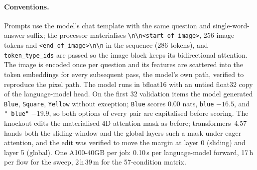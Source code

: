 \documentclass[11pt,a4paper]{article}
\begin{document}
\paragraph{Conventions.} Prompts use the model's chat template with the same
question and single-word-answer suffix; the processor materialises
\texttt{\textbackslash n\textbackslash n<start\_of\_image>}, 256 image tokens
and \texttt{<end\_of\_image>\textbackslash n\textbackslash n} in the sequence
(286 tokens), and \texttt{token\_type\_ids} are passed so the image block keeps
its bidirectional attention. The image is encoded once per question and its
features are scattered into the token embeddings for every subsequent pass,
the model's own path, verified to reproduce the pixel path. The model runs in
bfloat16 with an untied float32 copy of the language-model head. On the first
32 validation items the model generated \texttt{Blue}, \texttt{Square},
\texttt{Yellow} without exception; \texttt{Blue} scores $0.00$ nats,
\texttt{blue} $-16.5$, and \texttt{" blue"} $-19.9$, so both options of every
pair are capitalised before scoring. The knockout edits the materialised 4D
attention mask as before; transformers~4.57 hands both the sliding-window
and the global layers such a mask under eager attention, and the edit was
verified to move the margin at layer 0 (sliding) and layer 5 (global). One
A100-40GB per job: 0.10\,s per language-model forward, 17\,h per flow for the
sweep, 2\,h\,39\,m for the 57-condition matrix.
\end{document}
